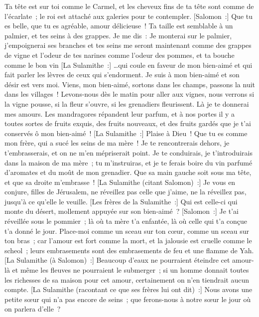\begin{multicols}{2}
Ta tête est sur toi comme le Carmel, et les cheveux fins de ta tête sont comme de l'écarlate~; le roi est attaché aux galeries pour te contempler.
[Salomon~:] Que tu es belle, que tu es agréable, amour délicieuse~!
Ta taille est semblable à un palmier, et tes seins à des grappes.
Je me dis~: Je monterai sur le palmier, j'empoignerai ses branches et tes seins me seront maintenant comme des grappes de vigne et l'odeur de tes narines comme l'odeur des pommes,
et ta bouche comme le bon vin [La Sulamithe~:] …qui coule en faveur de mon bien-aimé et qui fait parler les lèvres de ceux qui s'endorment.
Je suis à mon bien-aimé et son désir est vers moi.
Viens, mon bien-aimé, sortons dans les champs, passons la nuit dans les villages~!
Levons-nous dès le matin pour aller aux vignes, nous verrons si la vigne pousse, si la fleur s'ouvre, si les grenadiers fleurissent. Là je te donnerai mes amours.
Les mandragores répandent leur parfum, et à nos portes il y a toutes sortes de fruits exquis, des fruits nouveaux, et des fruits gardés que je t'ai conservés ô mon bien-aimé~!
\VerseOne{}[La Sulamithe~:] Plaise à Dieu~! Que tu es comme mon frère, qui a sucé les seins de ma mère~! Je te rencontrerais dehors, je t'embrasserais, et on ne m'en mépriserait point.
Je te conduirais, je t'introduirais dans la maison de ma mère~; tu m'instruiras, et je te ferais boire du vin parfumé d'aromates et du moût de mon grenadier.
Que sa main gauche soit sous ma tête, et que sa droite m'embrasse~!
[La Sulamithe (citant Salomon)~:] Je vous en conjure, filles de Jérusalem, ne réveillez pas celle que j'aime, ne la réveillez pas, jusqu'à ce qu'elle le veuille.
[Les frères de la Sulamithe~:] Qui est celle-ci qui monte du désert, mollement appuyée sur son bien-aimé~? [Salomon~:] Je t'ai réveillée sous le pommier~; là où ta mère t'a enfantée, là où celle qui t'a conçue t'a donné le jour.
Place-moi comme un sceau sur ton cœur, comme un sceau sur ton bras~; car l'amour est fort comme la mort, et la jalousie est cruelle comme le scheol~; leurs embrasements sont des embrasements de feu et une flamme de Yah.
[La Sulamithe (à Salomon)~:] Beaucoup d'eaux ne pourraient éteindre cet amour-là et même les fleuves ne pourraient le submerger~; si un homme donnait toutes les richesses de sa maison pour cet amour, certainement on n'en tiendrait aucun compte.
[La Sulamithe (racontant ce que ses frères lui ont dit)~:] Nous avons une petite sœur qui n'a pas encore de seins~; que ferons-nous à notre sœur le jour où on parlera d'elle~?

\end{multicols}
